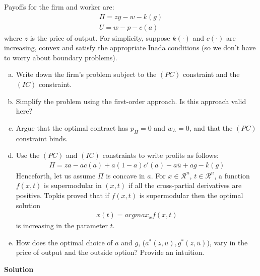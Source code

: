 \documentclass[a4paper]{article}
\newcommand{\ubar}{\overline}
\begin{document}
Payoffs for the firm and worker are:
\begin{align*}
\Pi = zy - w - k(g)\\
U = w - p -c(a)
\end{align*}
where $z$ is the price of output. For simplicity, suppose $k(\cdot)$ and $c(\cdot)$ are increasing,
convex and satisfy the appropriate Inada conditions (so we don't have to worry about
boundary problems).
\begin{enumerate}[(a)]
\item Write down the firm's problem subject to the $(PC)$ constraint and the $(IC)$ constraint.
\item Simplify the problem using the first-order approach. Is this approach valid here?
\item Argue that the optimal contract has $p_H = 0$ and $w_L = 0$, and that the $(PC)$ constraint binds.
\item Use the $(PC)$ and $(IC)$ constraints to write profits as follows:
\begin{align*}
\Pi = za - ac(a) + a(1-a)c'(a) - a\ubar{u} + ag-k(g)
\end{align*}
Henceforth, let us assume $\Pi$ is concave in $a$. For $x \in \mathscr{R}^n$, $t \in \mathscr{R}^n$, a function $f(x, t)$ is supermodular in $(x, t)$ if all the cross-partial derivatives are positive. Topkis proved that
if $f(x, t)$ is supermodular then the optimal solution
\begin{align*}
x(t) = argmax_xf(x, t)
\end{align*}
is increasing in the parameter $t$.
\item How does the optimal choice of $a$ and $g$, ($a^*(z, u), g^*(z, \ubar{u})$), vary in the price of
output and the outside option? Provide an intuition.
\end{enumerate}


\textbf{Solution}
\end{document}
